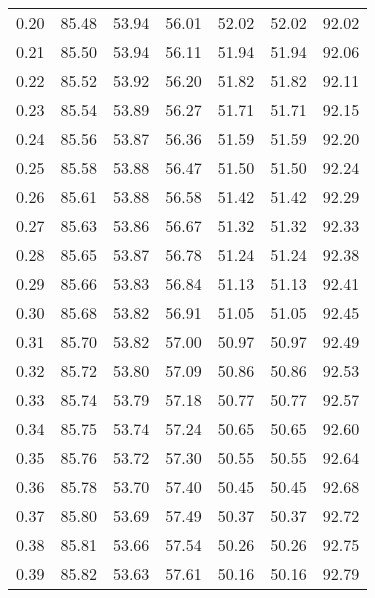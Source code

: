 \begin{tabular}{|c|c|c|c|c|c|c|}
      0.20 &     85.48 &     53.94 &      56.01 &   52.02 &      52.02 &         92.02 \\
      0.21 &     85.50 &     53.94 &      56.11 &   51.94 &      51.94 &         92.06 \\
      0.22 &     85.52 &     53.92 &      56.20 &   51.82 &      51.82 &         92.11 \\
      0.23 &     85.54 &     53.89 &      56.27 &   51.71 &      51.71 &         92.15 \\
      0.24 &     85.56 &     53.87 &      56.36 &   51.59 &      51.59 &         92.20 \\
      0.25 &     85.58 &     53.88 &      56.47 &   51.50 &      51.50 &         92.24 \\
      0.26 &     85.61 &     53.88 &      56.58 &   51.42 &      51.42 &         92.29 \\
      0.27 &     85.63 &     53.86 &      56.67 &   51.32 &      51.32 &         92.33 \\
      0.28 &     85.65 &     53.87 &      56.78 &   51.24 &      51.24 &         92.38 \\
      0.29 &     85.66 &     53.83 &      56.84 &   51.13 &      51.13 &         92.41 \\
      0.30 &     85.68 &     53.82 &      56.91 &   51.05 &      51.05 &         92.45 \\
      0.31 &     85.70 &     53.82 &      57.00 &   50.97 &      50.97 &         92.49 \\
      0.32 &     85.72 &     53.80 &      57.09 &   50.86 &      50.86 &         92.53 \\
      0.33 &     85.74 &     53.79 &      57.18 &   50.77 &      50.77 &         92.57 \\
      0.34 &     85.75 &     53.74 &      57.24 &   50.65 &      50.65 &         92.60 \\
      0.35 &     85.76 &     53.72 &      57.30 &   50.55 &      50.55 &         92.64 \\
      0.36 &     85.78 &     53.70 &      57.40 &   50.45 &      50.45 &         92.68 \\
      0.37 &     85.80 &     53.69 &      57.49 &   50.37 &      50.37 &         92.72 \\
      0.38 &     85.81 &     53.66 &      57.54 &   50.26 &      50.26 &         92.75 \\
      0.39 &     85.82 &     53.63 &      57.61 &   50.16 &      50.16 &         92.79 \\

\end{tabular}
